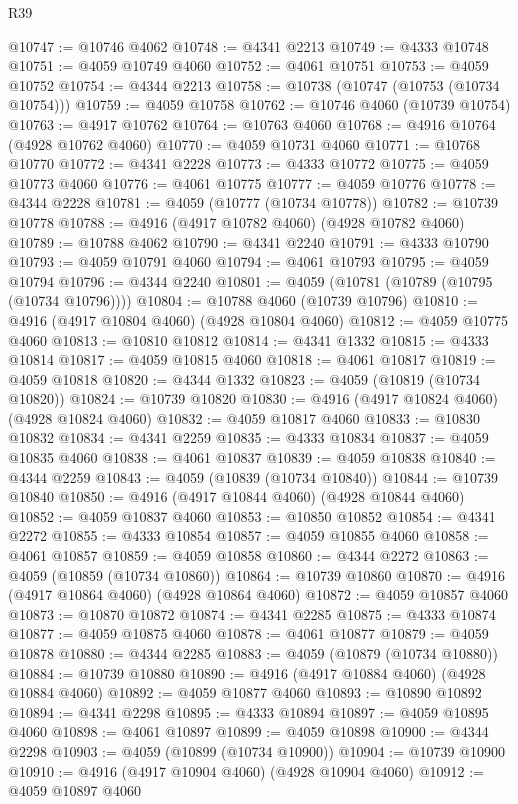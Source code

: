 \begin{lexlean}{R39}
\begin{coremodule}
@10747 := @10746 @4062
@10748 := @4341 @2213
@10749 := @4333 @10748
@10751 := @4059 @10749 @4060
@10752 := @4061 @10751
@10753 := @4059 @10752
@10754 := @4344 @2213
@10758 := @10738 (@10747 (@10753 (@10734 @10754)))
@10759 := @4059 @10758
@10762 := @10746 @4060 (@10739 @10754)
@10763 := @4917 @10762
@10764 := @10763 @4060
@10768 := @4916 @10764 (@4928 @10762 @4060)
@10770 := @4059 @10731 @4060
@10771 := @10768 @10770
@10772 := @4341 @2228
@10773 := @4333 @10772
@10775 := @4059 @10773 @4060
@10776 := @4061 @10775
@10777 := @4059 @10776
@10778 := @4344 @2228
@10781 := @4059 (@10777 (@10734 @10778))
@10782 := @10739 @10778
@10788 := @4916 (@4917 @10782 @4060) (@4928 @10782 @4060)
@10789 := @10788 @4062
@10790 := @4341 @2240
@10791 := @4333 @10790
@10793 := @4059 @10791 @4060
@10794 := @4061 @10793
@10795 := @4059 @10794
@10796 := @4344 @2240
@10801 := @4059 (@10781 (@10789 (@10795 (@10734 @10796))))
@10804 := @10788 @4060 (@10739 @10796)
@10810 := @4916 (@4917 @10804 @4060) (@4928 @10804 @4060)
@10812 := @4059 @10775 @4060
@10813 := @10810 @10812
@10814 := @4341 @1332
@10815 := @4333 @10814
@10817 := @4059 @10815 @4060
@10818 := @4061 @10817
@10819 := @4059 @10818
@10820 := @4344 @1332
@10823 := @4059 (@10819 (@10734 @10820))
@10824 := @10739 @10820
@10830 := @4916 (@4917 @10824 @4060) (@4928 @10824 @4060)
@10832 := @4059 @10817 @4060
@10833 := @10830 @10832
@10834 := @4341 @2259
@10835 := @4333 @10834
@10837 := @4059 @10835 @4060
@10838 := @4061 @10837
@10839 := @4059 @10838
@10840 := @4344 @2259
@10843 := @4059 (@10839 (@10734 @10840))
@10844 := @10739 @10840
@10850 := @4916 (@4917 @10844 @4060) (@4928 @10844 @4060)
@10852 := @4059 @10837 @4060
@10853 := @10850 @10852
@10854 := @4341 @2272
@10855 := @4333 @10854
@10857 := @4059 @10855 @4060
@10858 := @4061 @10857
@10859 := @4059 @10858
@10860 := @4344 @2272
@10863 := @4059 (@10859 (@10734 @10860))
@10864 := @10739 @10860
@10870 := @4916 (@4917 @10864 @4060) (@4928 @10864 @4060)
@10872 := @4059 @10857 @4060
@10873 := @10870 @10872
@10874 := @4341 @2285
@10875 := @4333 @10874
@10877 := @4059 @10875 @4060
@10878 := @4061 @10877
@10879 := @4059 @10878
@10880 := @4344 @2285
@10883 := @4059 (@10879 (@10734 @10880))
@10884 := @10739 @10880
@10890 := @4916 (@4917 @10884 @4060) (@4928 @10884 @4060)
@10892 := @4059 @10877 @4060
@10893 := @10890 @10892
@10894 := @4341 @2298
@10895 := @4333 @10894
@10897 := @4059 @10895 @4060
@10898 := @4061 @10897
@10899 := @4059 @10898
@10900 := @4344 @2298
@10903 := @4059 (@10899 (@10734 @10900))
@10904 := @10739 @10900
@10910 := @4916 (@4917 @10904 @4060) (@4928 @10904 @4060)
@10912 := @4059 @10897 @4060

\end{coremodule}
\end{lexlean}
